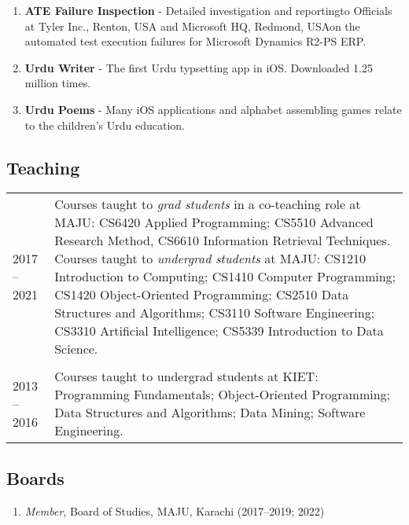 \documentclass[10pt]{article}
\begin{document}
\begin{enumerate}
\item \textbf{ATE Failure Inspection} - Detailed investigation and reporting\textemdash to Officials at Tyler Inc., Renton, USA and Microsoft HQ, Redmond, USA\textemdash on the automated test execution failures for Microsoft Dynamics R2-PS ERP.

\item \textbf{Urdu Writer} - The first Urdu typsetting app in iOS. Downloaded 1.25 million times.

\item \textbf{Urdu Poems} - Many iOS applications and alphabet assembling games relate to the children's Urdu education.
\end{enumerate}


\subsection*{Teaching}
\begin{tabularx}{\textwidth}{lX}
2017 – 2021 & Courses taught to \emph{grad students} in a co-teaching role at MAJU: CS6420 Applied Programming; CS5510 Advanced Research Method, CS6610 Information Retrieval Techniques.
\newline Courses taught to \emph{undergrad students} at MAJU: CS1210 Introduction to Computing; CS1410 Computer Programming; CS1420 Object-Oriented Programming; CS2510 Data Structures and Algorithms; CS3110 Software Engineering; CS3310 Artificial Intelligence; CS5339 Introduction to Data Science.
\\\\
2013 – 2016 & Courses taught to undergrad students at KIET: Programming Fundamentals; Object-Oriented Programming; Data Structures and Algorithms; Data Mining; Software Engineering.
\end{tabularx}

\subsection*{Boards}
\begin{enumerate}
\itemsep=0em
\item \emph{ Member}, Board of Studies, MAJU, Karachi (2017--2019; 2022)
\end{enumerate}
\end{document}

